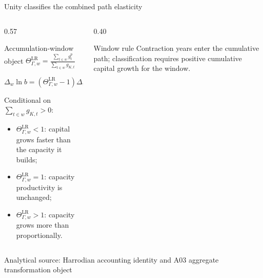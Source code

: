 \documentclass[10pt,aspectratio=169]{beamer}
\newcommand{\LR}{\mathrm{LR}}
\newcommand{\sourcefooter}[1]{%
  \par\vfill{\tiny\color{gray!70}Analytical source: #1}\vspace{-0.35em}}
\begin{document}
\begin{frame}{Unity classifies the combined path elasticity}
  \begin{columns}[T,onlytextwidth]
    \begin{column}{0.57\textwidth}
      \begin{block}{Accumulation-window object}
        \centering
        $\displaystyle
        \Theta_{\Gamma,w}^{\LR}
        =\frac{\sum_{t\in w}g_t^p}
               {\sum_{t\in w}g_{K,t}}$

        \vspace{0.5em}
        \Large
        $\displaystyle
        \Delta_w\ln b
        =\left(\Theta_{\Gamma,w}^{\LR}-1\right)
         \Delta_w\ln K^{cap}$
      \end{block}
      \small Conditional on $\sum_{t\in w}g_{K,t}>0$:
      \begin{itemize}
        \item $\Theta_{\Gamma,w}^{\LR}<1$: capital grows faster than the capacity it builds;
        \item $\Theta_{\Gamma,w}^{\LR}=1$: capacity productivity is unchanged;
        \item $\Theta_{\Gamma,w}^{\LR}>1$: capacity grows more than proportionally.
      \end{itemize}
    \end{column}
    \begin{column}{0.40\textwidth}
      \centering
      \begin{alertblock}{Window rule}
        Contraction years enter the cumulative path; classification requires positive cumulative capital growth for the window.
      \end{alertblock}
    \end{column}
  \end{columns}
  \sourcefooter{Harrodian accounting identity and A03 aggregate transformation object}
\end{frame}
\end{document}
